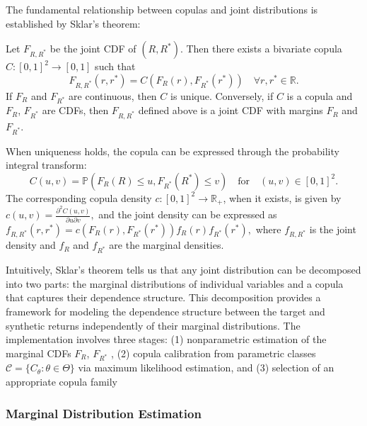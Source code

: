 The fundamental relationship between copulas and joint distributions is established by Sklar's theorem:

\begin{theorem}[Sklar (1959)]
Let $F_{R,R^*}$ be the joint CDF of $(R,R^*)$. Then there exists a bivariate copula $C: [0,1]^2 \to [0,1]$ such that
\begin{equation}
   F_{R,R^*}(r,r^*) = C(F_R(r), F_{R^*}(r^*)) \quad \forall r,r^* \in \mathbb{R}.
\end{equation}
If $F_R$ and $F_{R^*}$ are continuous, then $C$ is unique. Conversely, if $C$ is a copula and $F_R$, $F_{R^*}$ are CDFs, then $F_{R,R^*}$ defined above is a joint CDF with margins $F_R$ and $F_{R^*}$.
\end{theorem}
%
When uniqueness holds, the copula can be expressed through the probability integral transform: 
$$
C(u,v) = \mathbb P( F_R(R) \leq u, F_{R^*}(R^*) \leq v) 
\quad \text{for} \quad
(u,v)\in[0,1]^2
.
$$
The corresponding copula density $c:[0,1]^2\to\mathbb R_+$, when it exists, is given by
$
   c(u,v) = \frac{\partial^2 C(u,v)}{\partial u \partial v},
$
and the joint density can be expressed as
$
   f_{R,R^*}(r,r^*) = c(F_R(r), F_{R^*}(r^*)) f_R(r)f_{R^*}(r^*),
$
where $f_{R,R^*}$ is the joint density and $f_R$ and $f_{R^*}$ are the marginal densities.

Intuitively, Sklar's theorem tells us that any joint distribution can be decomposed into two parts: the marginal distributions of individual variables and a copula that captures their dependence structure. 
This decomposition provides a framework for modeling the dependence structure between the target and synthetic returns independently of their marginal distributions. The implementation involves three stages: (1) nonparametric estimation of the marginal CDFs $F_R$, $F_{R^*}$ , (2) copula calibration from parametric classes $\mathcal{C} = \{C_\theta : \theta \in \Theta\}$ via maximum likelihood estimation, and (3) selection of an appropriate copula family 



\subsubsection{Marginal Distribution Estimation}


